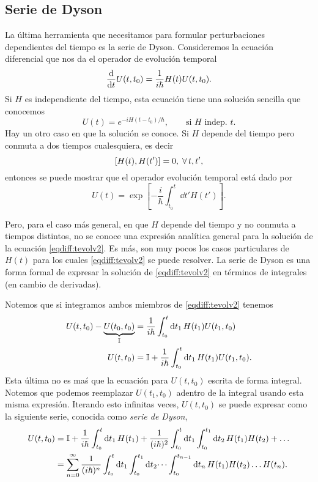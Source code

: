 \documentclass[10pt, a4paper]{article}
\numberwithin{equation}{subsection}
\begin{document}
\subsection{Serie de Dyson}
La última herramienta que necesitamos para formular perturbaciones dependientes
del tiempo es la serie de Dyson. Consideremos la ecuación diferencial que nos
da el operador de evolución temporal
\begin{equation} \label{eqdiff:tevolv2}
  \dv{t}U(t,t_0) = \frac{1}{i\hbar}H(t)U(t,t_0).
\end{equation}
Si $H$ es independiente del tiempo, esta ecuación tiene una solución sencilla
que conocemos
\begin{equation}
  U(t) = e^{-iH(t-t_0)/\hbar}, \qquad\text{si } H \text{ indep. } t.
\end{equation}
Hay un otro caso en que la solución se conoce. Si $H$ depende del tiempo pero
conmuta a dos tiempos cualesquiera, es decir
\begin{equation}
  \comm{H(t)}{H(t')} = 0, \;\forall\,t,t',
\end{equation}
entonces se puede mostrar que el operador evolución temporal está dado por
\begin{equation}
  U(t) = \exp\left[-\frac{i}{\hbar}\int_{t_0}^t\dd{t'}H(t')\right].
\end{equation}

Pero, para el caso más general, en que $H$ depende del tiempo y no conmuta a
tiempos distintos, no se conoce una expresión analítica general para la
solución de la ecuación \eqref{eqdiff:tevolv2}. Es más, son muy pocos los casos
particulares de $H(t)$ para los cuales \eqref{eqdiff:tevolv2} se puede
resolver. La serie de Dyson es una forma formal de expresar la solución de
\eqref{eqdiff:tevolv2} en términos de integrales (en cambio de derivadas).

Notemos que si integramos ambos miembros de \eqref{eqdiff:tevolv2} tenemos
\begin{align}
  U(t,t_0) - \underbrace{U(t_0,t_0)}_{\mathbb{I}} &=
    \frac{1}{i\hbar}\int_{t_0}^{t}\dd{t_1}H(t_1)U(t_1,t_0) \\
  U(t,t_0) &= \mathbb{I} + \frac{1}{i\hbar}\int_{t_0}^{t}\dd{t_1}H(t_1)U(t_1,t_0).
\end{align}
Esta última no es maś que la ecuación para $U(t,t_0)$ escrita de forma
integral. Notemos que podemos reemplazar $U(t_1,t_0)$ adentro de la integral
usando esta misma expresión. Iterando esto infinitas veces, $U(t,t_0)$ se puede
expresar como la siguiente serie, conocida como \emph{serie de Dyson},
\begin{align}
  U(t,t_0)
  &= \mathbb{I} + \frac{1}{i\hbar} \int_{t_0}^{t}\dd{t_1} H(t_1) +
    \frac{1}{(i\hbar)^2} \int_{t_0}^{t}\dd{t_1} \int_{t_0}^{t_1}\dd{t_2}
    H(t_1)H(t_2) + \dots \\
  &= \sum_{n=0}^{\infty}\frac{1}{(i\hbar)^n} \int_{t_0}^{t}\dd{t_1}
    \int_{t_0}^{t_1}\dd{t_2} \dots \int_{t_0}^{t_{n-1}}\dd{t_n}
    H(t_1)H(t_2) \dots H(t_n).
\end{align}
\end{document}

